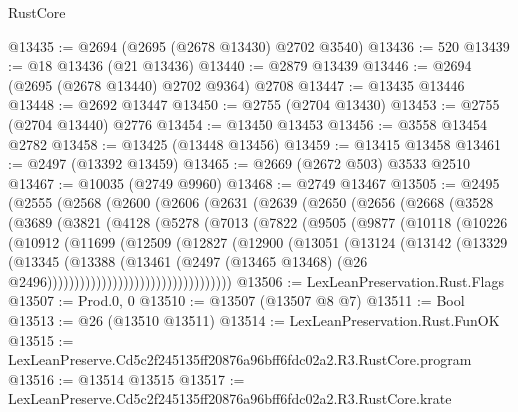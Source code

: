\begin{lexlean}{RustCore}
\begin{coremodule}
@13435 := @2694 (@2695 (@2678 @13430) @2702 @3540)
@13436 := 520
@13439 := @18 @13436 (@21 @13436)
@13440 := @2879 @13439
@13446 := @2694 (@2695 (@2678 @13440) @2702 @9364) @2708
@13447 := @13435 @13446
@13448 := @2692 @13447
@13450 := @2755 (@2704 @13430)
@13453 := @2755 (@2704 @13440) @2776
@13454 := @13450 @13453
@13456 := @3558 @13454 @2782
@13458 := @13425 (@13448 @13456)
@13459 := @13415 @13458
@13461 := @2497 (@13392 @13459)
@13465 := @2669 (@2672 @503) @3533 @2510
@13467 := @10035 (@2749 @9960)
@13468 := @2749 @13467
@13505 := @2495
    (@2555
      (@2568
        (@2600
          (@2606
            (@2631
              (@2639
                (@2650
                  (@2656
                    (@2668
                      (@3528
                        (@3689
                          (@3821
                            (@4128
                              (@5278
                                (@7013
                                  (@7822
                                    (@9505
                                      (@9877
                                        (@10118
                                          (@10226
                                            (@10912
                                              (@11699
                                                (@12509
                                                  (@12827
                                                    (@12900
                                                      (@13051
                                                        (@13124
                                                          (@13142
                                                            (@13329
                                                              (@13345
                                                                (@13388
                                                                  (@13461
                                                                    (@2497
                                                                      (@13465 @13468)
                                                                      (@26
                                                                        @2496))))))))))))))))))))))))))))))))))
@13506 := LexLeanPreservation.Rust.Flags
@13507 := Prod.{0, 0}
@13510 := @13507 (@13507 @8 @7)
@13511 := Bool
@13513 := @26 (@13510 @13511)
@13514 := LexLeanPreservation.Rust.FunOK
@13515 := LexLeanPreserve.Cd5c2f245135ff20876a96bff6fdc02a2.R3.RustCore.program
@13516 := @13514 @13515
@13517 := LexLeanPreserve.Cd5c2f245135ff20876a96bff6fdc02a2.R3.RustCore.krate

\end{coremodule}
\end{lexlean}
